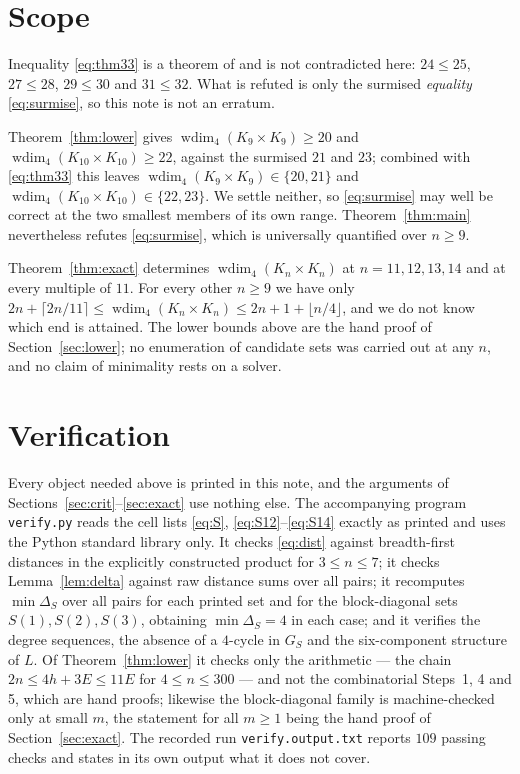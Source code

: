 \documentclass[11pt]{amsart}
\theoremstyle{remark}
\DeclareMathOperator{\wdim}{wdim}
\begin{document}
\section{Scope}\label{sec:status}

Inequality \eqref{eq:thm33} is a theorem of \cite{FKY} and is not contradicted
here: $24\le25$, $27\le28$, $29\le30$ and $31\le32$. What is refuted is only
the surmised \emph{equality} \eqref{eq:surmise}, so this note is not an
erratum.

Theorem~\ref{thm:lower} gives $\wdim_4(K_9\times K_9)\ge20$ and
$\wdim_4(K_{10}\times K_{10})\ge22$, against the surmised $21$ and $23$;
combined with \eqref{eq:thm33} this leaves
$\wdim_4(K_9\times K_9)\in\{20,21\}$ and
$\wdim_4(K_{10}\times K_{10})\in\{22,23\}$. We settle neither, so
\eqref{eq:surmise} may well be correct at the two smallest members of its own
range. Theorem~\ref{thm:main} nevertheless refutes \eqref{eq:surmise}, which is
universally quantified over $n\ge9$.

Theorem~\ref{thm:exact} determines $\wdim_4(K_n\times K_n)$ at $n=11,12,13,14$
and at every multiple of $11$. For every other $n\ge9$ we have only
$2n+\lceil2n/11\rceil\le\wdim_4(K_n\times K_n)\le2n+1+\lfloor n/4\rfloor$, and
we do not know which end is attained. The lower bounds above are the hand proof
of Section~\ref{sec:lower}; no enumeration of candidate sets was carried out at
any $n$, and no claim of minimality rests on a solver.

\section{Verification}

Every object needed above is printed in this note, and the arguments of
Sections~\ref{sec:crit}--\ref{sec:exact} use nothing else. The accompanying
program \texttt{verify.py} reads the cell lists \eqref{eq:S},
\eqref{eq:S12}--\eqref{eq:S14} exactly as printed and uses the Python standard
library only. It checks \eqref{eq:dist} against breadth-first distances in the
explicitly constructed product for $3\le n\le7$; it checks
Lemma~\ref{lem:delta} against raw distance sums over all pairs; it recomputes
$\min\Delta_S$ over all pairs for each printed set and for the block-diagonal
sets $S(1),S(2),S(3)$, obtaining $\min\Delta_S=4$ in each case; and it verifies
the degree sequences, the absence of a $4$-cycle in $G_S$ and the
six-component structure of $L$. Of Theorem~\ref{thm:lower} it checks only the
arithmetic --- the chain $2n\le4h+3E\le11E$ for $4\le n\le300$ --- and not the
combinatorial Steps~1, 4 and 5, which are hand proofs; likewise the
block-diagonal family is machine-checked only at small $m$, the statement for
all $m\ge1$ being the hand proof of Section~\ref{sec:exact}. The recorded run
\texttt{verify.output.txt} reports $109$ passing checks and states in its own
output what it does not cover.
\end{document}
